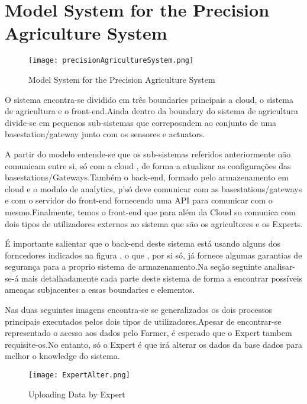 \section{Model System for the Precision Agriculture System}

\begin{figure}[H]

	\centering

 	\texttt{[image: precisionAgricultureSystem.png]}

 	\caption {Model System for the Precision Agriculture System}

  	\label{fig01}
\end{figure}

	O sistema encontra-se dividido em três boundaries principais a cloud, o sistema de agricultura e o front-end.Ainda dentro da boundary do sistema de agricultura divide-se em pequenos sub-sistemas que correposndem ao conjunto de uma basestation/gateway junto com os sensores e actuators.

	A partir do modelo entende-se que os sub-sistemas referidos anteriormente não comunicam entre si, só com a cloud , de forma a atualizar as configurações das basestations/Gateways.Também o back-end, formado pelo armazenamento em cloud e o modulo de analytics, p'só deve comunicar com as basestations/gateways e com o servidor do front-end fornecendo uma API para comunicar com o mesmo.Finalmente, temos o front-end que para além da Cloud so comunica com dois tipos de utilizadores externos ao sistema que são os agricultores e os Experts.

	É importante salientar que o back-end deste sistema está usando alguns dos forncedores indicados na figura , o que , por si só, já fornece algumas garantias de segurança para a proprio sistema de armazenamento.Na seção seguinte analisar-se-á mais detalhadamente cada parte deste sistema de forma a encontrar possíveis ameaças subjacentes a essas boundaries e elementos.

	Nas duas seguintes imagens encontra-se se generalizados os dois processos principais executados pelos dois tipos de utilizadores.Apesar de encontrar-se representado o acesso aos dados pelo Farmer, é esperado que o Expert tambem requisite-os.No entanto, só o Expert é que irá alterar os dados da base dados para melhor o knowledge do sistema.

\begin{figure}[h!]

	\centering

 	\texttt{[image: ExpertAlter.png]}

 	\caption {Uploading Data by Expert}

  	\label{fig02}
\end{figure}



